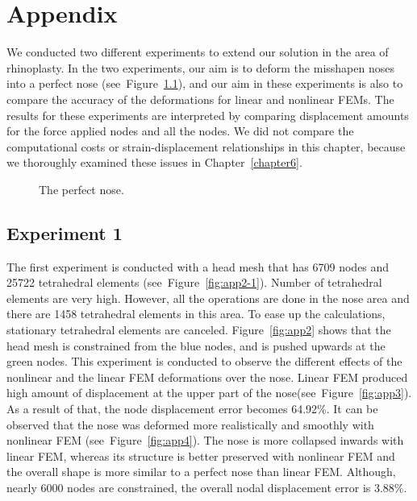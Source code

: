 \chapter{Appendix}
\label{chapter8}

We conducted two different experiments to extend our solution in the area of rhinoplasty. In the two experiments, our aim is to deform the misshapen noses into a perfect nose (see~Figure~\ref{fig:app1}), and our aim in these experiments is also to compare the accuracy of the deformations for linear and nonlinear FEMs. The results for these experiments are interpreted by comparing displacement amounts for the force applied nodes and all the nodes. We did not compare the computational costs or strain-displacement relationships in this chapter, because we thoroughly examined these issues in Chapter~\ref{chapter6}.

\begin{figure}[c]
\centerline{}
\caption{The perfect nose.}
\label{fig:app1}
\end{figure}

\section{Experiment 1}
\label{ai}

The first experiment is conducted with a head mesh that has 6709 nodes and 25722 tetrahedral elements (see~Figure~\ref{fig:app2-1}). Number of tetrahedral elements are very high. However, all the operations are done in the nose area and there are 1458 tetrahedral elements in this area. To ease up the calculations, stationary tetrahedral elements are canceled. Figure~\ref{fig:app2} shows that the head mesh is constrained from the blue nodes, and is pushed upwards at the green nodes. This experiment is conducted to observe the different effects of the nonlinear and the linear FEM deformations over the nose. Linear FEM produced high amount of displacement at the upper part of the nose(see~Figure~\ref{fig:app3}). As a result of that, the node displacement error becomes 64.92\%. It can be observed that the nose was deformed more realistically and smoothly with nonlinear FEM (see~Figure~\ref{fig:app4}). The nose is more collapsed inwards with linear FEM, whereas its structure is better preserved with nonlinear FEM and the overall shape is more similar to a perfect nose than linear FEM. Although, nearly 6000 nodes are constrained, the overall nodal displacement error is 3.88\%.

